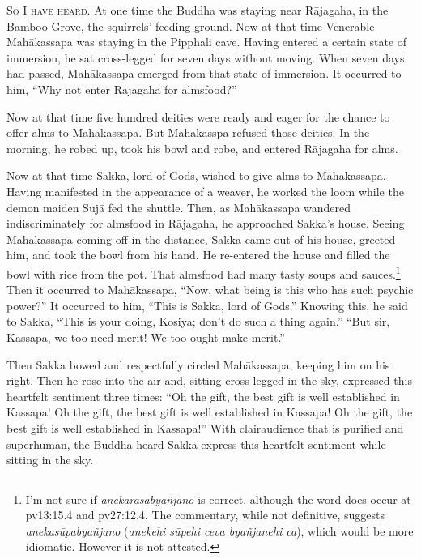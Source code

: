 \documentclass[12pt,openany]{book}%
\newcommand*{\scevam}[1]{\textsc{#1}}
\begin{document}
\scevam{So I have heard. }At one time the Buddha was staying near \textsanskrit{Rājagaha}, in the Bamboo Grove, the squirrels’ feeding ground. Now at that time Venerable \textsanskrit{Mahākassapa} was staying in the Pipphali cave. Having entered a certain state of immersion, he sat cross-legged for seven days without moving. When seven days had passed, \textsanskrit{Mahākassapa} emerged from that state of immersion. It occurred to him, “Why not enter \textsanskrit{Rājagaha} for almsfood?” 

Now at that time five hundred deities were ready and eager for the chance to offer alms to \textsanskrit{Mahākassapa}. But \textsanskrit{Mahākasspa} refused those deities. In the morning, he robed up, took his bowl and robe, and entered \textsanskrit{Rājagaha} for alms. 

Now at that time Sakka, lord of Gods, wished to give alms to \textsanskrit{Mahākassapa}. Having manifested in the appearance of a weaver, he worked the loom while the demon maiden \textsanskrit{Sujā} fed the shuttle. Then, as \textsanskrit{Mahākassapa} wandered indiscriminately for almsfood in \textsanskrit{Rājagaha}, he approached Sakka’s house. Seeing \textsanskrit{Mahākassapa} coming off in the distance, Sakka came out of his house, greeted him, and took the bowl from his hand. He re-entered the house and filled the bowl with rice from the pot. That almsfood had many tasty soups and sauces.\footnote{I’m not sure if \textit{\textsanskrit{anekarasabyañjano}} is correct, although the word does occur at pv13:15.4 and pv27:12.4. The commentary, while not definitive, suggests \textit{\textsanskrit{anekasūpabyañjano}} (\textit{anekehi \textsanskrit{sūpehi} ceva \textsanskrit{byañjanehi} ca}), which would be more idiomatic. However it is not attested. } Then it occurred to \textsanskrit{Mahākassapa}, “Now, what being is this who has such psychic power?” It occurred to him, “This is Sakka, lord of Gods.” Knowing this, he said to Sakka, “This is your doing, Kosiya; don’t do such a thing again.” “But sir, Kassapa, we too need merit! We too ought make merit.” 

Then Sakka bowed and respectfully circled \textsanskrit{Mahākassapa}, keeping him on his right. Then he rose into the air and, sitting cross-legged in the sky, expressed this heartfelt sentiment three times: “Oh the gift, the best gift is well established in Kassapa! Oh the gift, the best gift is well established in Kassapa! Oh the gift, the best gift is well established in Kassapa!” With clairaudience that is purified and superhuman, the Buddha heard Sakka express this heartfelt sentiment while sitting in the sky. 
\end{document}
